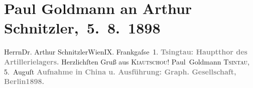 

         
         \renewcommand{\erwaehntePersonen}{Personen: Paul Goldmann}
         \renewcommand{\erwaehnteInstitutionen}{Institutionen: Graphische Gesellschaft (Berlin)}
         \renewcommand{\erwaehnteOrte}{Orte: Artillerielager Tsingtau, Berlin, China, Frankgasse, Kiautschou, Qingdao, Wien}
         \renewcommand{\erwaehnteWerke}{}
               \section[ Paul Goldmann an Arthur Schnitzler, 5. 8. 1898]{ Paul Goldmann an Arthur Schnitzler, 5. 8. 1898}\nopagebreak{}\rehead{ }\begin{ledgroupsized}[t]{13cm}\normalsize\beginnumbering \toendnotes[C]{\smallbreak\pagebreak[2]} 
\pstart{}{\pb}Herrn\pend{}\pstart{}Dr. Arthur Schnitzler\pend{}\pstart{}Wien\pend{}\pstart{}IX. Frankgaſse 1.\pend{}{\bigskip}\pstart
           \noindent{}\centering{}{\pb}\textcolor{gray}{\textbf{Tsingtau: Hauptthor des
                     Artillerielagers.}}\pend
           \pstart
           Herzlichſten Gruß aus \textsc{Kiautschou}! \spacefill\mbox{Paul Goldmann}\pend
           \pstart
           \textsc{Tsintau}, 5. Auguſt\pend
           \pstart
           \centering{}\textcolor{gray}{\textbf{Aufnahme in China u.
                     Ausführung: Graph. Gesellschaft, Berlin1898.}}\pend
           
         
         \endnumbering{}\end{ledgroupsized}  \newcommand{\dateiname}{L02855}\newcommand{\titel}{Paul Goldmann an Arthur Schnitzler, 5. 8. 1898}\newcommand{\editorInnen}{Martin Anton Müller und Laura Untner}
      